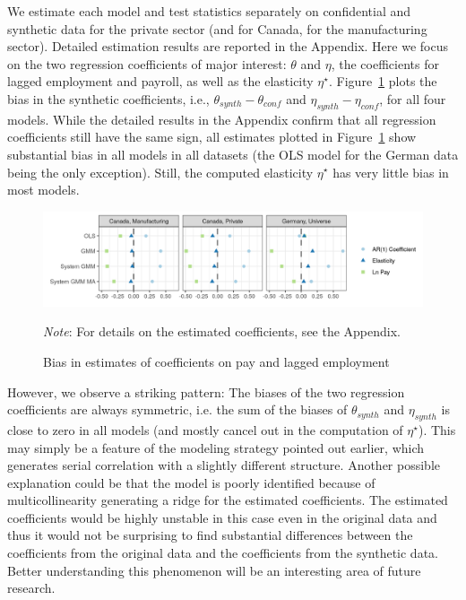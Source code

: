 \documentclass[10pt]{article}
\begin{document}
We estimate each model and test statistics separately on confidential and synthetic data for the private sector (and for Canada, for the manufacturing sector). Detailed estimation results are reported in the  Appendix. Here we  focus on the two regression coefficients of major interest: $\theta$ and $\eta$, the coefficients for lagged employment and payroll, as well as the elasticity $\eta^\star$. Figure~\ref{fig:estimates3} plots the bias in the synthetic coefficients, i.e., $\theta_{synth}-\theta_{conf}$ and $\eta_{synth}-\eta_{conf}$, for all four models. While the detailed results in the  Appendix confirm that all regression coefficients still have the same sign, all estimates plotted in Figure~\ref{fig:estimates3} show substantial bias in all models in all datasets (the OLS model for the German data being the only exception). Still, the computed elasticity $\eta^\star$ has very little bias in most models.


\begin{figure} [H]
\centering
\includegraphics[width=\linewidth]{r-graphs/fig_estimates3.png}
\caption{Bias in estimates of coefficients on  pay and lagged employment\label{fig:estimates3}} 
\begin{minipage}{0.70\linewidth}
{\footnotesize \textit{Note}: For details on the estimated coefficients, see the  Appendix. \par}
\end{minipage}
\end{figure}
 
However, we observe a striking pattern: The biases of the two regression coefficients are always symmetric, i.e. the sum of the biases of $\theta_{synth}$ and $\eta_{synth}$ is close to zero in all models (and mostly cancel out in the computation of $\eta^\star$). 
This may simply be a feature of the modeling strategy pointed out earlier, which generates serial correlation with a slightly different structure. Another possible explanation could be that the model is poorly identified because of multicollinearity generating a ridge for the estimated coefficients. The estimated coefficients would be highly unstable in this case even in the original data and thus it would not be surprising to find substantial differences between the coefficients from the original data and the coefficients from the synthetic data. Better understanding this phenomenon will be an interesting area of future research.
\end{document}
